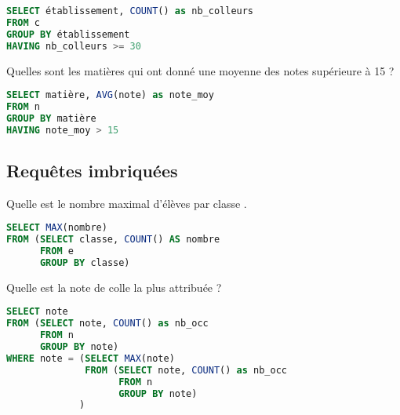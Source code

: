\begin{Answer}
\begin{lstlisting}[language=SQL]
SELECT établissement, COUNT() as nb_colleurs
FROM c
GROUP BY établissement
HAVING nb_colleurs >= 30
\end{lstlisting}
\end{Answer}
\begin{Exercise}
Quelles sont les matières qui ont donné une moyenne des notes supérieure à 15 ?
\end{Exercise}
\begin{Answer}
\begin{lstlisting}[language=SQL]
SELECT matière, AVG(note) as note_moy
FROM n
GROUP BY matière
HAVING note_moy > 15
\end{lstlisting}
\end{Answer}
\subsection{Requêtes imbriquées} 
\begin{Exercise}
Quelle est le nombre maximal d'élèves par classe .
\end{Exercise}
\begin{Answer}
\begin{lstlisting}[language=SQL]
SELECT MAX(nombre)
FROM (SELECT classe, COUNT() AS nombre
      FROM e
      GROUP BY classe)
\end{lstlisting}
\end{Answer}
\begin{Exercise}
Quelle est la note de colle la plus attribuée ?
\end{Exercise}
\begin{Answer}
\begin{lstlisting}[language=SQL]
SELECT note
FROM (SELECT note, COUNT() as nb_occ
      FROM n
      GROUP BY note)
WHERE note = (SELECT MAX(note)
              FROM (SELECT note, COUNT() as nb_occ
                    FROM n
                    GROUP BY note)
             )
\end{lstlisting}
\end{Answer}
